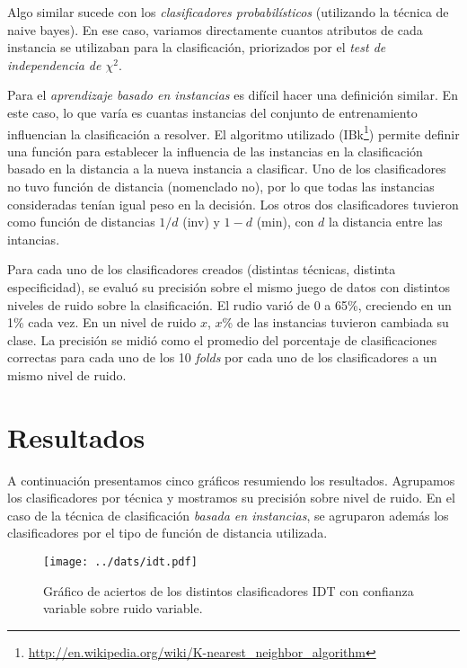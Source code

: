 \documentclass[a4paper,10pt]{article}
\begin{document}
Algo similar sucede con los \emph{clasificadores probabilísticos} (utilizando la técnica de \textsf{naive bayes}). En ese caso, variamos directamente cuantos atributos de cada instancia se utilizaban para la clasificación, priorizados por el \emph{test de independencia de $\chi^2$}. 

Para el \emph{aprendizaje basado en instancias} es difícil hacer una definición similar. En este caso, lo que varía es cuantas instancias del conjunto de entrenamiento influencian la clasificación a resolver. El algoritmo utilizado (\textsf{IBk}\footnote{\url{http://en.wikipedia.org/wiki/K-nearest\_neighbor\_algorithm}}) permite definir una función para establecer la influencia de las instancias en la clasificación basado en la distancia a la nueva instancia a clasificar. Uno de los clasificadores no tuvo función de distancia (nomenclado \textsf{no}), por lo que todas las instancias consideradas tenían igual peso en la decisión. Los otros dos clasificadores tuvieron como función de distancias $1/d$ (\textsf{inv}) y $1-d$ (\textsf{min}), con $d$ la distancia entre las intancias. 

Para cada uno de los clasificadores creados (distintas técnicas, distinta especificidad), se evaluó su precisión sobre el mismo juego de datos con distintos niveles de ruido sobre la clasificación. El rudio varió de 0 a 65\%, creciendo en un 1\% cada vez. En un nivel de ruido $x$, $x$\% de las instancias tuvieron cambiada su clase. La precisión se midió como el promedio del porcentaje de clasificaciones correctas para cada uno de los 10 \emph{folds} por cada uno de los clasificadores a un mismo nivel de ruido.

\section{Resultados}

A continuación presentamos cinco gráficos resumiendo los resultados. Agrupamos los clasificadores por técnica y mostramos su precisión sobre nivel de ruido. En el caso de la técnica de clasificación \emph{basada en instancias}, se agruparon además los clasificadores por el tipo de función de distancia utilizada. 

\begin{figure}[h]
\centering
\texttt{[image: ../dats/idt.pdf]}
\caption{Gráfico de aciertos de los distintos clasificadores \textsf{IDT} con confianza variable sobre ruido variable.}\label{fig:idt}
\end{figure}
\end{document}
